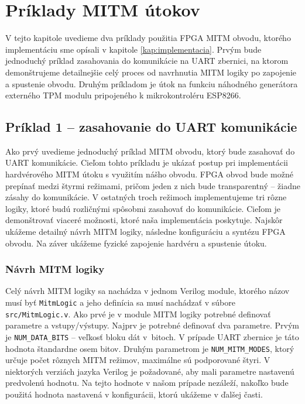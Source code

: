 \chapter{Príklady MITM útokov}
\label{kap:priklady}

V tejto kapitole uvedieme dva príklady použitia FPGA MITM obvodu, ktorého implementáciu sme opísali v kapitole \ref{kap:implementacia}. Prvým bude jednoduchý príklad zasahovania do komunikácie na UART zbernici, na ktorom demonštrujeme detailnejšie celý proces od navrhnutia MITM logiky po zapojenie a spustenie obvodu. Druhým príkladom je útok na funkciu náhodného generátora externého TPM modulu pripojeného k mikrokontroléru ESP8266.

\section{Príklad 1 -- zasahovanie do UART komunikácie} \label{sek:example1}
Ako prvý uvedieme jednoduchý príklad MITM obvodu, ktorý bude zasahovať do UART komunikácie. Cieľom tohto príkladu je ukázať postup pri implementácii hardvérového MITM útoku s využitím nášho obvodu. FPGA obvod bude možné prepínať medzi štyrmi režimami, pričom jeden z nich bude transparentný -- žiadne zásahy do komunikácie. V ostatných troch režimoch implementujeme tri rôzne logiky, ktoré budú rozličnými spôsobmi zasahovať do komunikácie. Cieľom je demonštrovať viaceré možnosti, ktoré naša implementácia poskytuje. Najskôr ukážeme detailný návrh MITM logiky, následne konfiguráciu a syntézu FPGA obvodu. Na záver ukážeme fyzické zapojenie hardvéru a spustenie útoku.

\subsection{Návrh MITM logiky} \label{subsek:uartMitmLogic}
Celý návrh MITM logiky sa nachádza v jednom Verilog module, ktorého názov musí byť \texttt{MitmLogic} a jeho definícia sa musí nachádzať v súbore \texttt{src/MitmLogic.v}. Ako prvé je v module MITM logiky potrebné definovať parametre a vstupy/výstupy. Najprv je potrebné definovať dva parametre. Prvým je \texttt{NUM\_DATA\_BITS} -- veľkosť bloku dát v~bitoch. V prípade UART zbernice je táto hodnota štandardne osem bitov. Druhým parametrom je \texttt{NUM\_MITM\_MODES}, ktorý určuje počet rôznych MITM režimov, maximálne sú podporované štyri. V niektorých verziách jazyka Verilog je požadované, aby mali parametre nastavenú predvolenú hodnotu. Na tejto hodnote v našom prípade nezáleží, nakoľko bude použitá hodnota nastavená v konfigurácii, ktorú ukážeme v ďalšej časti.

